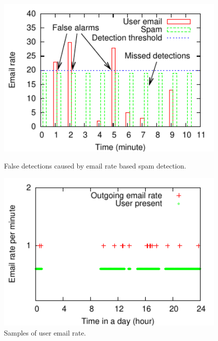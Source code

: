 \begin{figure}[tb]
\begin{center}
\begin{minipage}[t]{.49\textwidth}
     \includegraphics[width=1\textwidth]{sensor/email}
\vspace*{-4mm}
\caption{False detections caused by email rate based
spam detection.}
\label{fig:detect-by-rate}
\end{minipage}
\begin{minipage}[t]{.5\textwidth}
\includegraphics[width=1\textwidth]{sensor/email-norm}
\vspace*{-4mm}
\caption{Samples of user email rate.}
\label{fig:email}
\end{minipage}
\end{center}
\end{figure}

